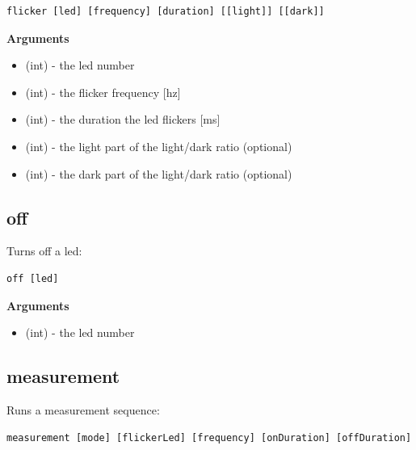 \begin{verbatim}
flicker [led] [frequency] [duration] [[light]] [[dark]]
\end{verbatim}

\textbf{Arguments}
\begin{itemize}
\item {} 
 (int) - the led number

\item {} 
 (int) - the flicker frequency {[}hz{]}

\item {} 
 (int) - the duration the led flickers {[}ms{]}

\item {} 
 (int) - the light part of the light/dark ratio (optional)

\item {} 
 (int) - the dark part of the light/dark ratio (optional)

\end{itemize}


\subsection{off}
\label{appendix/led-protocol:protocol-input-off}\label{appendix/led-protocol:off}
Turns off a led:

\begin{verbatim}
off [led]
\end{verbatim}

\textbf{Arguments}
\begin{itemize}
\item {} 
 (int) - the led number

\end{itemize}


\subsection{measurement}
\label{appendix/led-protocol:protocol-input-measurement}\label{appendix/led-protocol:measurement}
Runs a measurement sequence:

\begin{verbatim}
measurement [mode] [flickerLed] [frequency] [onDuration] [offDuration]
\end{verbatim}

